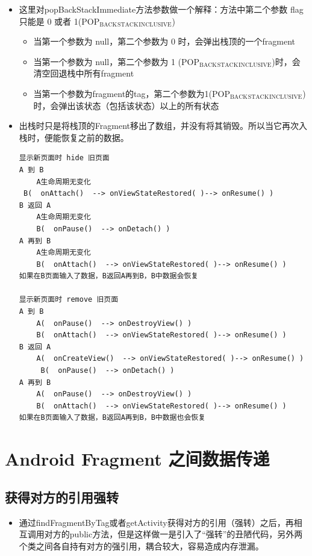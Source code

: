 \documentclass[9pt, b5paaper]{book}
\begin{document}
\begin{itemize}
\item 这里对popBackStackImmediate方法参数做一个解释：方法中第二个参数 flag 只能是 0 或者 1(POP$_{\text{BACK}}$$_{\text{STACK}}$$_{\text{INCLUSIVE}}$)
\begin{itemize}
\item 当第一个参数为 null，第二个参数为 0 时，会弹出栈顶的一个fragment
\item 当第一个参数为 null，第二个参数为 1 (POP$_{\text{BACK}}$$_{\text{STACK}}$$_{\text{INCLUSIVE}}$)时，会清空回退栈中所有fragment
\item 当第一个参数为fragment的tag，第二个参数为1(POP$_{\text{BACK}}$$_{\text{STACK}}$$_{\text{INCLUSIVE}}$)时，会弹出该状态（包括该状态）以上的所有状态
\end{itemize}
\item 出栈时只是将栈顶的Fragment移出了数组，并没有将其销毁。所以当它再次入栈时，便能恢复之前的数据。
\begin{verbatim}
显示新页面时 hide 旧页面
A 到 B
    A生命周期无变化
 B(  onAttach()  --> onViewStateRestored( )--> onResume() )
B 返回 A
    A生命周期无变化
    B(  onPause()  --> onDetach() )
A 再到 B
    A生命周期无变化
    B(  onAttach()  --> onViewStateRestored( )--> onResume() )
如果在B页面输入了数据，B返回A再到B，B中数据会恢复

显示新页面时 remove 旧页面
A 到 B
    A(  onPause()  --> onDestroyView() )
    B(  onAttach()  --> onViewStateRestored( )--> onResume() )
B 返回 A
    A(  onCreateView()  --> onViewStateRestored( )--> onResume() )
     B(  onPause()  --> onDetach() )
A 再到 B
    A(  onPause()  --> onDestroyView() )
    B(  onAttach()  --> onViewStateRestored( )--> onResume() )
如果在B页面输入了数据，B返回A再到B，B中数据也会恢复
\end{verbatim}
\end{itemize}

\chapter{Android Fragment 之间数据传递}
\label{sec-3}
\section{获得对方的引用强转}
\label{sec-3-1}
\begin{itemize}
\item 通过findFragmentByTag或者getActivity获得对方的引用（强转）之后，再相互调用对方的public方法，但是这样做一是引入了“强转”的丑陋代码，另外两个类之间各自持有对方的强引用，耦合较大，容易造成内存泄漏。
\end{itemize}
\end{document}
